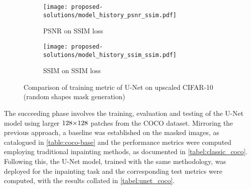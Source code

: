 \begin{figure}[ht]
    \begin{subfigure}[b]{0.32\textwidth}
        \centering
        \texttt{[image: proposed-solutions/model\_history\_psnr\_ssim.pdf]}
        \caption{PSNR on SSIM loss}
        \label{fig:psnr_ssim}
    \end{subfigure}
    \hspace*{\fill}
    \begin{subfigure}[b]{0.32\textwidth}
        \centering
        \texttt{[image: proposed-solutions/model\_history\_ssim\_ssim.pdf]}
        \caption{SSIM on SSIM loss}
        \label{fig:ssim_ssim}
    \end{subfigure}
    \caption[Comparison of training metric of U-Net on upscaled CIFAR-10]{Comparison of training metric of U-Net on upscaled CIFAR-10\\(random shapes mask generation)}
    \label{fig:train_metrics_cifar}
\end{figure}

The succeeding phase involves the training, evaluation and testing of the U-Net model using larger $128
    {\times} 128$ patches from the COCO dataset. Mirroring the previous approach, a baseline was established on the masked images, as catalogued in \autoref{table:coco-base} and the performance metrics were computed employing traditional inpainting methods, as documented in \autoref{tabel:classic_coco}. Following this, the U-Net model, trained with the same methodology, was deployed for the inpainting task and the corresponding test metrics were computed, with the results collated in \autoref{tabel:unet_coco}.

